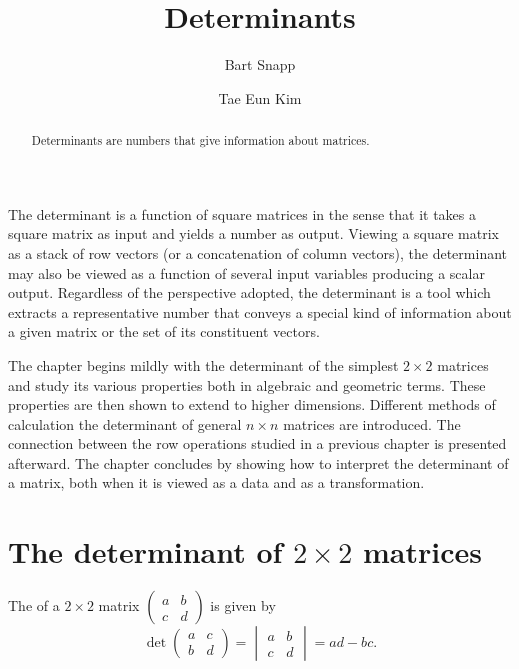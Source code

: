 \documentclass{ximera}
\author{Bart Snapp \and Tae Eun Kim}
\title{Determinants}
\begin{document}
\begin{abstract}
  Determinants are numbers that give information about matrices.
\end{abstract}
\maketitle

The determinant is a function of square matrices in the sense that it
takes a square matrix as input and yields a number as output. Viewing
a square matrix as a stack of row vectors (or a concatenation of
column vectors), the determinant may also be viewed as a function of
several input variables producing a scalar output. Regardless of the
perspective adopted, the determinant is a tool which extracts a
representative number that conveys a special kind of information about a
given matrix or the set of its constituent vectors.

The chapter begins mildly with the determinant of the simplest
$2 \times 2$ matrices and study its various properties both in algebraic
and geometric terms. These properties are then shown to extend to
higher dimensions. Different methods of calculation the determinant of
general $n \times n$ matrices are introduced. The connection between the
row operations studied in a previous chapter is presented
afterward. The chapter concludes by showing how to interpret the
determinant of a matrix, both when it is viewed as a data and as a
transformation.

\section{The determinant of $2 \times 2$ matrices}

\begin{definition}\label{defn:det-2by2}
  The  of a $2 \times 2$ matrix $\begin{pmatrix} a & b \\
    c & d \end{pmatrix}$ is given by
  \[
    \det
    \begin{pmatrix}
      a & c\\
      b & d
    \end{pmatrix}
    =
    \begin{vmatrix}
      a & b\\
      c & d
    \end{vmatrix}
    = ad - bc.
  \]
\end{definition}
\end{document}
